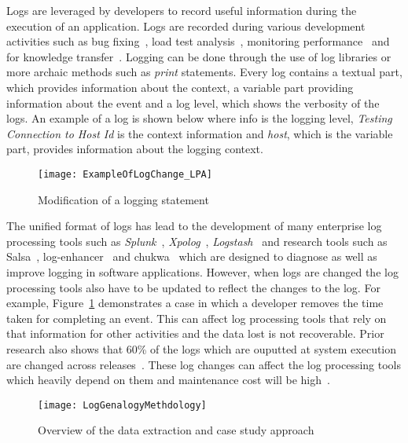 

Logs are leveraged by developers to record useful information during the execution of an application. Logs are recorded during various development activities such as bug fixing~\cite{ConsoleLogs,JGLouMining,QFuanomaly}, load test analysis~\cite{Automatic}, monitoring performance~\cite{Yuan} and for knowledge transfer~\cite{IanWCRE}.
Logging can be done through the use of log libraries or more archaic methods such as \textsl{print} statements. Every log contains a textual part, which provides information about the context, a variable part providing information about the event and a log level, which shows the verbosity of the logs. An example of a log is shown below where info is the logging level, \textsl{Testing Connection to Host Id} is the context information and \textsl{host}, which is the variable part, provides information about the logging context.

\begin{figure}[tb]
	\centering
	\texttt{[image: ExampleOfLogChange\_LPA]}
	\caption{Modification of a logging statement}
	\label{fig:ExampleOfLogChange_LPA}
\end{figure}


The unified format of logs has lead to the development of many enterprise log processing tools such as \textsl{Splunk}~\cite{carasso2012exploring}, \textsl{Xpolog}~\cite{xpolog}, \textsl{Logstash}~\cite{xu2013detecting} and research tools such as Salsa~\cite{TanSalsa}, log-enhancer~\cite{Yuan} and chukwa~\cite{chukwa} which are designed to diagnose as well as improve logging in software applications. However, when logs are changed the log processing tools also have to be updated to reflect the changes to the log. For example, Figure~\ref{fig:ExampleOfLogChange_LPA} demonstrates a case in which a developer removes the time taken for completing an event. This can affect log processing tools that rely on that information for other activities and the data lost is not recoverable. Prior research also shows that 60\% of the logs which are ouputted at system execution are changed across releases~\cite{IanWCRE}. These log changes can affect the log processing tools which heavily depend on them and maintenance cost will be high~\cite{IanWCRE}. 

\begin{figure*}
	\centering
	\texttt{[image: LogGenalogyMethdology]}
	\caption{Overview of the data extraction and case study approach}
	\label{fig:LGmethod}
\end{figure*}


